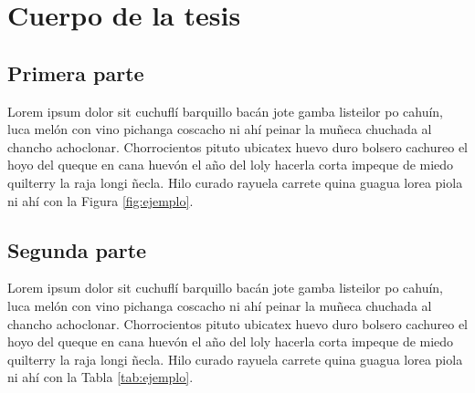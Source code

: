 \chapter{Cuerpo de la tesis}
\label{cap:cuerpo}

\section{Primera parte}
\label{sec:primera}

Lorem ipsum dolor sit cuchufl\'i barquillo bac\'an jote gamba listeilor po cahu\'in, luca mel\'on con vino pichanga coscacho ni ah\'i peinar la muñeca chuchada al chancho achoclonar. Chorrocientos pituto ubicatex huevo duro bolsero cachureo el hoyo del queque en cana huev\'on el año del loly hacerla corta impeque de miedo quilterry la raja longi ñecla. Hilo curado rayuela carrete quina guagua lorea piola ni ah\'i con la Figura \ref{fig:ejemplo}.


\section{Segunda parte}
\label{sec:segunda}

Lorem ipsum dolor sit cuchufl\'i barquillo bac\'an jote gamba listeilor po cahu\'in, luca mel\'on con vino pichanga coscacho ni ah\'i peinar la muñeca chuchada al chancho achoclonar. Chorrocientos pituto ubicatex huevo duro bolsero cachureo el hoyo del queque en cana huev\'on el año del loly hacerla corta impeque de miedo quilterry la raja longi ñecla. Hilo curado rayuela carrete quina guagua lorea piola ni ah\'i con la Tabla \ref{tab:ejemplo}.


